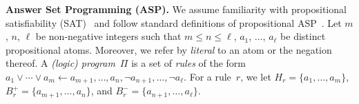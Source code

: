 \documentclass{article}
\def\SAT{\textsf{SAT}\xspace}
\begin{document}
\smallskip
\noindent\textbf{Answer Set Programming (ASP).} %
%
We assume familiarity with propositional satisfiability (\SAT)~\cite{KleineBuningLettman99}
and follow standard definitions of propositional ASP~\cite{BrewkaEiterTruszczynski11}.
%
Let $m$, $n$, $\ell$ be non-negative integers such that
$m \leq n \leq \ell$, $a_1$, $\ldots$, $a_\ell$ be distinct propositional
atoms. Moreover, we refer by \emph{literal} to an atom or the negation
thereof.
%
A \emph{(logic) program}~$\Pi$ is a set of \emph{rules} of the form
%
\(
a_1\vee \cdots \vee a_m \leftarrow a_{m+1}, \ldots, a_{n}, \neg
a_{n+1}, \ldots, \neg a_\ell.
%
\)
%
%
%
%
%
%
%
%
%
For a rule~$r$, we let $H_r = \{a_1, \ldots, a_m\}$,
$B^+_r = \{a_{m+1}, \ldots, a_{n}\}$, and
$B^-_r = \{a_{n+1}, \ldots, a_\ell\}$.
%
\end{document}
